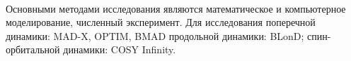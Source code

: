 ~\\
\par {\methods} Основными методами исследования являются математическое и компьютерное моделирование, численный эксперимент. Для исследования поперечной динамики: MAD-X, OPTIM, BMAD продольной динамики: BLonD; спин-орбитальной динамики: COSY Infinity.
~\\
\begin{comment}
\par {\defpositions}
\begin{enumerate}[beginpenalty=10000] %
  \item 	Принципы построения дуальной магнитооптической структуры с оптимизированным временем жизни пучка в регулярной структуре для многозарядных тяжелых ионов и варьированной критической энергией в резонансной структуре для легких ядер; \cite{Kolokolchikov:2025_dual}, \cite{Syresin:2021_polar}
  \item	Результаты, полученные в эксперименте на У-70 и в методе численного моделирования динамики продольного движения вблизи критической энергии с учётом влияния высших порядков зависимости от разброса по импульсу и с учетом импеданса; \cite{Kolokolchikov:2025_U70}, \cite{Kolokolchikov:2025_jump}
  \item	Результаты исследования продольной динамики поляризованного пучка для процедуры скачка критической энергии в гармоническом и барьерном ВЧ, оценка влияния продольной микроволновой неустойчивости; \cite{Kolokolchikov:2024_bb_rupac}, \cite{Kolokolchikov:2023_bb_IPAC}, \cite{Kolokolchikov:2024_bb_dspin}
  \item	Метод подавления дисперсии и влияния нелинейных эффектов, из-за нарушения периодичности за счет введения missing magnet на краях поворотных арок, для создания резонансной магнитооптической структуры; \cite{Kolokolchikov:2021trans}, \cite{Kolokolchikov:2023_pecular}
  \item	Модернизированная структура с квази-замороженным спином для исследования ЭДМ дейтронов и протонов и возможностью совместного использования Нуклотрона в качестве бустера поляризованных частиц для коллайдера; \cite{Senichev:2023_QFS}, \cite{Senichev:2023_nuclotron}, \cite{Kolokolchikov:2025_nuclotron}
  \item	Метод обводных каналов bypass для независимого исследования ЭДМ в кольце коллайдера;\cite{Kolokolchikov:2023_bypass}, \cite{Kolokolchikov:2023_bypass_IPAC}, \cite{Senichev:2024_nica_edm}, \cite{Kolokolchikov:2023_sc}, \cite{Kolokolchikov:2023_sc_IPAC}
\end{enumerate}
\end{comment}

